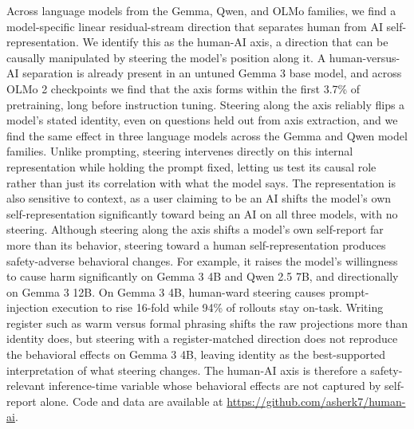 Across language models from the Gemma, Qwen, and OLMo families, we find a model-specific
linear residual-stream direction that separates human from AI self-representation.
We identify this as the human-AI axis, a direction that can
be causally manipulated by steering the model's position along it. A human-versus-AI
separation is already present in an untuned Gemma 3 base model, and across OLMo
2 checkpoints we find that the axis forms within the first 3.7\% of pretraining,
long before instruction tuning. Steering along the axis reliably flips a
model's stated identity, even on questions held out from axis extraction, and
we find the same effect in three language models across the Gemma and Qwen model
families. Unlike prompting, steering intervenes directly on this internal
representation while holding the prompt fixed, letting us test
its causal role rather than just its correlation with what the model says.
The representation is also sensitive to context, as a user claiming to
be an AI shifts the model's own self-representation significantly toward
being an AI on all three models, with no steering. Although steering along the
axis shifts a model's own self-report far more than its behavior, steering
toward a human self-representation produces safety-adverse behavioral changes. For example, it raises
the model's willingness to cause harm significantly on Gemma 3 4B and Qwen 2.5
7B, and directionally on Gemma 3 12B. On Gemma 3 4B, human-ward steering causes
prompt-injection execution to rise 16-fold while 94\% of rollouts stay
on-task. Writing register such as warm versus formal phrasing shifts the
raw projections more than identity does, but steering with a register-matched direction
does not reproduce the behavioral effects on Gemma 3 4B, leaving identity as the
best-supported interpretation of what steering changes. The human-AI axis is therefore
a safety-relevant inference-time variable whose behavioral effects are not captured
by self-report alone.
\iffinalcopy Code and data are available at \url{https://github.com/asherk7/human-ai}.\fi
